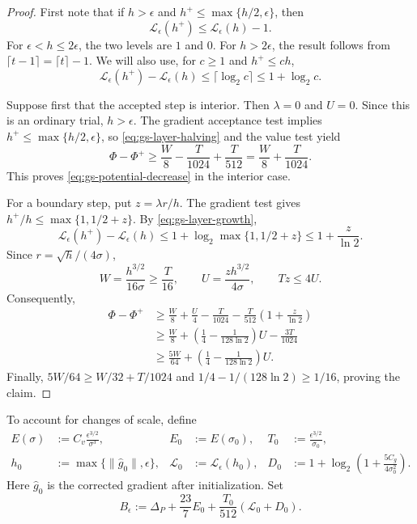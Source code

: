 \documentclass{article}
\begin{document}
\begin{proof}
First note that if $h>\epsilon$ and
$h^+\le\max\{h/2,\epsilon\}$, then
\begin{equation}\label{eq:gs-layer-halving}
 \mathcal L_\epsilon(h^+)\le\mathcal L_\epsilon(h)-1.
\end{equation}
For $\epsilon<h\le2\epsilon$, the two levels are $1$ and $0$.
For $h>2\epsilon$, the result follows from
$\lceil t-1\rceil=\lceil t\rceil-1$.
We will also use, for $c\ge1$ and $h^+\le ch$,
\begin{equation}\label{eq:gs-layer-growth}
 \mathcal L_\epsilon(h^+)-\mathcal L_\epsilon(h)
 \le\lceil\log_2c\rceil\le1+\log_2c.
\end{equation}

Suppose first that the accepted step is interior.  Then $\lambda=0$
and $U=0$.  Since this is an ordinary trial, $h>\epsilon$.
The gradient acceptance test implies
$h^+\le\max\{h/2,\epsilon\}$, so \eqref{eq:gs-layer-halving} and
the value test yield
\[
 \Phi-\Phi^+\ge\frac W8-\frac T{1024}+\frac T{512}
 =\frac W8+\frac T{1024}.
\]
This proves \eqref{eq:gs-potential-decrease} in the interior case.

For a boundary step, put $z=\lambda r/h$.  The gradient test gives
$h^+/h\le\max\{1,1/2+z\}$.  By \eqref{eq:gs-layer-growth},
\[
 \mathcal L_\epsilon(h^+)-\mathcal L_\epsilon(h)
 \le1+\log_2\max\{1,1/2+z\}
 \le1+\frac z{\ln2}.
\]
Since $r=\sqrt h/(4\sigma)$,
\[
 W=\frac{h^{3/2}}{16\sigma}\ge\frac T{16},
 \qquad
 U=\frac{zh^{3/2}}{4\sigma},
 \qquad Tz\le4U.
\]
Consequently,
\begin{align*}
 \Phi-\Phi^+
 &\ge\frac W8+\frac U4-\frac T{1024}
       -\frac T{512}\left(1+\frac z{\ln2}\right)\\
 &\ge\frac W8+
       \left(\frac14-\frac1{128\ln2}\right)U
       -\frac{3T}{1024}\\
 &\ge\frac{5W}{64}
       +\left(\frac14-\frac1{128\ln2}\right)U.
\end{align*}
Finally,
$5W/64\ge W/32+T/1024$ and
$1/4-1/(128\ln2)\ge1/16$, proving the claim.
\end{proof}

To account for changes of scale, define
\begin{equation}\label{eq:gs-budget-parameters}
\begin{aligned}
 E(\sigma)&:=C_v\frac{\epsilon^{3/2}}{\sigma^3},
 &E_0&:=E(\sigma_0),
 &T_0&:=\frac{\epsilon^{3/2}}{\sigma_0},\\
 h_0&:=\max\{\|\widehat g_0\|,\epsilon\},
 &\mathcal L_0&:=\mathcal L_\epsilon(h_0),
 &D_0&:=1+\log_2\left(1+\frac{5C_g}{4\sigma_0^2}\right).
\end{aligned}
\end{equation}
Here $\widehat g_0$ is the corrected gradient after initialization.
Set
\begin{equation}\label{eq:gs-budget}
 B_\epsilon:=
 \Delta_P+\frac{23}{7}E_0+\frac{T_0}{512}(\mathcal L_0+D_0).
\end{equation}
\end{document}

